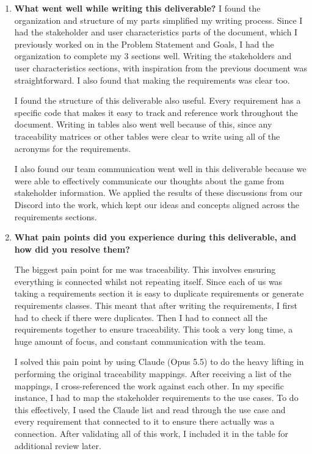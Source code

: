 \documentclass[10pt]{article}
\begin{document}
\begin{enumerate}

    \item \textbf{What went well while writing this deliverable?}
    I found the organization and structure of my parts simplified my 
    writing process. Since I had the stakeholder and user characteristics 
    parts of the document, which I previously worked on in the Problem 
    Statement and Goals, I had the organization to complete my 3 sections well.
    Writing the stakeholders and user characteristics sections, with inspiration 
    from the previous document was straightforward. I also found that making the 
    requirements was clear too.

    I found the structure of this deliverable also useful. Every requirement has 
    a specific code that makes it easy to track and reference work throughout the 
    document. Writing in tables also went well because of this, since any traceability 
    matrices or other tables were clear to write using all of the acronyms for the 
    requirements. 
    
    I also found our team communication went well in this deliverable because we were 
    able to effectively communicate our thoughts about the game from stakeholder information. 
    We applied the results of these discussions from our Discord into the work, which kept our ideas and concepts aligned across the requirements sections.

    \item \textbf{What pain points did you experience during this
    deliverable, and how did you resolve them?}

    The biggest pain point for me was traceability. This involves ensuring everything is 
    connected whilst not repeating itself. Since each of us was taking a requirements section 
    it is easy to duplicate requirements or generate requirements classes. This meant that after 
    writing the requirements, I first had to check if there were duplicates. Then I had to 
    connect all the requirements together to ensure traceability. This took a very long time, 
    a huge amount of focus, and constant communication with the team.

    I solved this pain point by using Claude (Opus 5.5) to do the heavy lifting in performing 
    the original traceability mappings. After receiving a list of the mappings, I cross-referenced 
    the work against each other. In my specific instance, I had to map the stakeholder requirements 
    to the use cases. To do this effectively, I used the Claude list and read through the use case 
    and every requirement that connected to it to ensure there actually was a connection. After validating 
    all of this work, I included it in the table for additional review later.


\end{enumerate}
\end{document}
